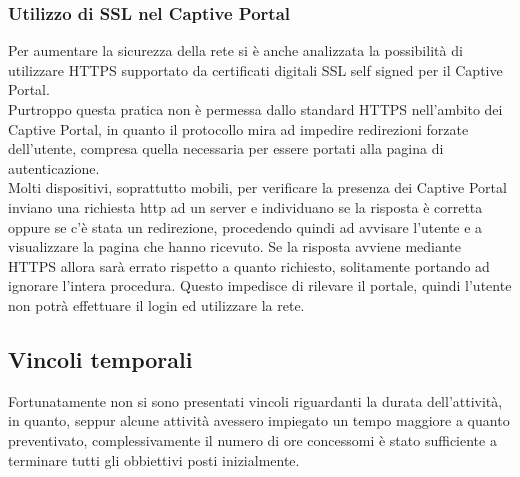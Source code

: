 \documentclass[Tesi.tex]{subfiles}
\begin{document}
\subsubsection{Utilizzo di SSL nel Captive Portal}
Per aumentare la sicurezza della rete si è anche analizzata la possibilità di utilizzare HTTPS supportato da certificati digitali SSL self signed per il Captive Portal. \\
Purtroppo questa pratica non è permessa dallo standard HTTPS nell'ambito dei Captive Portal, in quanto il protocollo mira ad impedire redirezioni forzate dell'utente, compresa quella necessaria per essere portati alla pagina di autenticazione. \\
Molti dispositivi, soprattutto mobili, per verificare la presenza dei Captive Portal inviano una richiesta http ad un server e individuano se la risposta è corretta oppure se c'è stata un redirezione, procedendo quindi ad avvisare l'utente e a visualizzare la pagina che hanno ricevuto. Se la risposta avviene mediante HTTPS allora sarà errato rispetto a quanto richiesto, solitamente portando ad ignorare l'intera procedura. Questo impedisce di rilevare il portale, quindi l'utente non potrà effettuare il login ed utilizzare la rete.

\subsection{Vincoli temporali}
Fortunatamente non si sono presentati vincoli riguardanti la durata dell'attività, in quanto, seppur alcune attività avessero impiegato un tempo maggiore a quanto preventivato, complessivamente il numero di ore concessomi è stato sufficiente a terminare tutti gli obbiettivi posti inizialmente.
\end{document}
